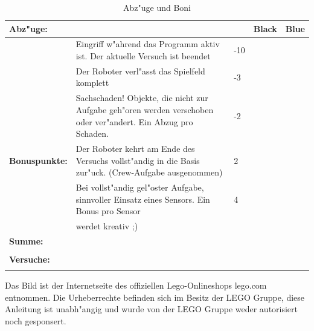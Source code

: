 \documentclass[
	ngerman,
	accentcolor=1c,%
	]{tudapub}
\begin{document}
\begin{table}[h]
	\begin{tabular}{|p{}|p{}|p{}|p{}|p{}|} \hline
		\textbf{Abz"uge:}& \space &\space&\textbf{Black}&\textbf{Blue} \\ \hline 
		\space& Eingriff w"ahrend das Programm aktiv ist. Der aktuelle Versuch ist beendet &-10&\space&\space \\ \hline
		\space& Der Roboter verl"asst das Spielfeld komplett &-3&\space&\space \\ \hline
		\space& Sachschaden! Objekte, die nicht zur Aufgabe geh"oren werden verschoben oder ver"andert. Ein Abzug pro Schaden. &-2&\space&\space \\ \hline
		\textbf{Bonuspunkte:}& Der Roboter kehrt am Ende des Versuchs vollst"andig in die Basis zur"uck. (Crew-Aufgabe ausgenommen) &2&\space&\space \\ \hline
		\space& Bei vollst"andig gel"oster Aufgabe, sinnvoller Einsatz eines Sensors. Ein Bonus pro Sensor &4&\space&\space \\ \hline
		\space& werdet kreativ ;) & \space &\space&\space \\ \hline
		\textbf{Summe:}& \space &\space&\space&\space \\  
		\space& \space &\space&\space&\space \\  \hline
		\textbf{Versuche:}& \space &\space&\space&\space \\ 
		\space& \space &\space&\space&\space \\  \hline
	\end{tabular}
	\caption{Abz"uge und Boni}
\end{table}

\bigskip \bigskip \bigskip \bigskip \bigskip

\tiny Das Bild ist der Internetseite des offiziellen Lego-Onlineshops lego.com entnommen. Die Urheberrechte befinden sich im Besitz der LEGO Gruppe, diese Anleitung ist unabh"angig und wurde von der LEGO Gruppe weder autorisiert noch gesponsert.

\cfoot{\textcolor{lightgray} \today}
\end{document}
